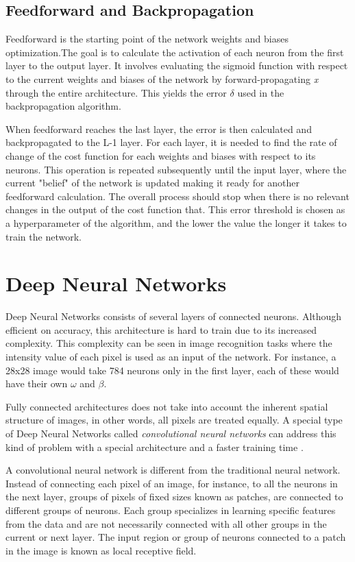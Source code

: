 \documentclass{article}
\begin{document}
\subsection{Feedforward and Backpropagation}\label{subsec:backprop}

Feedforward is the starting point of the network weights and biases optimization.The goal is to calculate the activation of each neuron from the first layer to the output layer. It involves evaluating the sigmoid function with respect to the current weights and biases of the network by forward-propagating \textit{x} through the entire architecture. This yields the error $\delta$ used in the backpropagation algorithm.

When feedforward reaches the last layer, the error is then calculated and backpropagated to the L-1 layer. For each layer, it is needed to find the rate of change of the cost function for each weights and biases with respect to its neurons. This operation is repeated subsequently until the input layer, where the current "belief" of the network is updated making it ready for another feedforward calculation. The overall process should stop when there is no relevant changes in the output of the cost function that. This error threshold is chosen as a hyperparameter of the algorithm, and the lower the value the longer it takes to train the network.

\section{Deep Neural Networks}

Deep Neural Networks consists of several layers of connected neurons. Although efficient on accuracy, this architecture is hard to train due to its increased complexity. This complexity can be seen in image recognition tasks where the intensity value of each pixel is used as an input of the network. For instance, a 28x28 image would take 784 neurons only in the first layer, each of these would have their own $\omega$ and $\beta$.

Fully connected architectures does not take into account the inherent spatial structure of images, in other words, all pixels are treated equally. A special type of Deep Neural Networks called \textit{convolutional neural networks} can address this kind of problem with a special architecture and a faster training time \cite{krizhevsky2012}.

A convolutional neural network is different from the traditional neural network. Instead of connecting each pixel of an image, for instance, to all the neurons in the next layer, groups of pixels of fixed sizes known as patches, are connected to different groups of neurons. Each group specializes in learning specific features from the data and are not necessarily connected with all other groups in the current or next layer. The input region or group of neurons connected to a patch in the image is known as local receptive field. 
\end{document}
